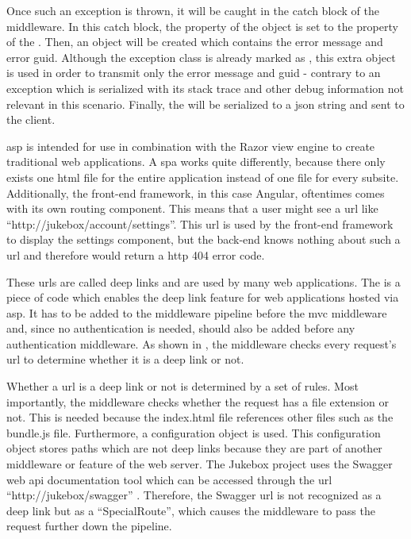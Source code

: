 Once such an exception is thrown, it will be caught in the catch block of the middleware. In this catch block, the  property of the  object is set to the  property of the . Then, an  object will be created which contains the error message and error \gls{guid}. Although the exception class is already marked as \lstcode{[Serializable]}, this extra object is used in order to transmit only the error message and \gls{guid} - contrary to an exception which is serialized with its stack trace and other debug information not relevant in this scenario. Finally, the  will be serialized to a \gls{json} string and sent to the client.





\gls{asp} is intended for use in combination with the Razor view engine to create traditional web applications. A \gls{spa} works quite differently, because there only exists one \gls{html} file for the entire application instead of one file for every subsite. Additionally, the front-end framework, in this case Angular, oftentimes comes with its own routing component. This means that a user might see a \gls{url} like \enquote{http://jukebox/account/settings}. This \gls{url} is used by the front-end framework to display the settings component, but the back-end knows nothing about such a \gls{url} and therefore would return a \gls{http} 404 error code.

These \glspl{url} are called deep links and are used by many web applications. The  is a piece of code which enables the deep link feature for web applications hosted via \gls{asp}. It has to be added to the middleware pipeline before the \gls{mvc} middleware and, since no authentication is needed, should also be added before any authentication middleware. As shown in , the middleware checks every request's \gls{url} to determine whether it is a deep link or not.

Whether a \gls{url} is a deep link or not is determined by a set of rules. Most importantly, the middleware checks whether the request has a file extension or not. This is needed because the index.html file references other files such as the bundle.js file. Furthermore, a configuration object is used. This configuration object stores paths which are not deep links because they are part of another middleware or feature of the web server. The Jukebox project uses the Swagger web \gls{api} documentation tool which can be accessed through the \gls{url} \enquote{http://jukebox/swagger} \cite{swagger}. Therefore, the Swagger \gls{url} is not recognized as a deep link but as a \enquote{SpecialRoute}, which causes the middleware to pass the request further down the pipeline.

